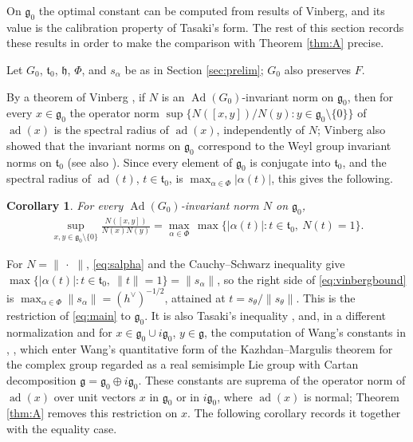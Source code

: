 \documentclass [leqno, 10pt]{amsart}
\newtheorem{corollary}[theorem]{Corollary}%
\theoremstyle{definition}
\numberwithin{equation}{section}
\newcommand{\h}{\mathfrak{h}}
\newcommand{\dum}{\,\cdot\,\,}
\newcommand{\al}{\alpha}
\newcommand{\g}{\mathfrak{g}}
\newcommand{\ad}{\operatorname{ad}}
\newcommand{\Ad}{\operatorname{Ad}}
\newcommand{\gz}{\g_{0}}
\newcommand{\hv}{h^\vee}
\newcommand{\norm}[1]{\lVert #1\rVert}
\begin{document}
On $\gz$ the optimal constant can be computed from results of Vinberg, and its value is the calibration property of Tasaki's form. The rest of this section records these results in order to make the comparison with Theorem \ref{thm:A} precise.

Let $G_{0}$, $\mathfrak{t}_{0}$, $\h$, $\Phi$, and $s_{\al}$ be as in Section \ref{sec:prelim}; $G_{0}$ also preserves $F$.

By a theorem of Vinberg \cite[Theorem~2]{Vinberg-invariantnorms}, if $N$ is an $\Ad(G_{0})$-invariant norm on $\gz$, then for every $x \in \gz$ the operator norm $\sup\{N([x, y])/N(y): y \in \gz \setminus \{0\}\}$ of $\ad(x)$ is the spectral radius of $\ad(x)$, independently of $N$; Vinberg also showed that the invariant norms on $\gz$ correspond to the Weyl group invariant norms on $\mathfrak{t}_{0}$ \cite[Theorem~1]{Vinberg-invariantnorms} (see also \cite{Berestovksii-Nikonorov}). Since every element of $\gz$ is conjugate into $\mathfrak{t}_{0}$, and the spectral radius of $\ad(t)$, $t \in \mathfrak{t}_{0}$, is $\max_{\al \in \Phi}|\al(t)|$, this gives the following.
\begin{corollary}\label{cor:vinberg}
For every $\Ad(G_{0})$-invariant norm $N$ on $\gz$,
\begin{align}\label{eq:vinbergbound}
\sup_{x, y \in \gz\setminus\{0\}}\frac{N([x, y])}{N(x)N(y)} = \max_{\al \in \Phi}\,\max\big\{|\al(t)|: t \in \mathfrak{t}_{0},\ N(t) = 1\big\}.
\end{align}
\end{corollary}
For $N = \norm{\dum}$, \eqref{eq:salpha} and the Cauchy--Schwarz inequality give $\max\{|\al(t)| : t \in \mathfrak{t}_{0},\ \norm{t} = 1\} = \norm{s_{\al}}$, so the right side of \eqref{eq:vinbergbound} is $\max_{\al \in \Phi}\norm{s_{\al}} = (\hv)^{-1/2}$, attained at $t = s_{\theta}/\norm{s_{\theta}}$. This is the restriction of \eqref{eq:main} to $\gz$. It is also Tasaki's inequality \cite[(8) in the proof of Theorem~5]{Tasaki-calibration}, and, in a different normalization and for $x \in \gz \cup i\gz$, $y \in \g$, the computation of Wang's constants in \cite{Wang-nilpotent}, \cite[Proposition 4.1]{Adeboye-Wang-Wei}, which enter Wang's quantitative form of the Kazhdan--Margulis theorem for the complex group regarded as a real semisimple Lie group with Cartan decomposition $\g = \gz \oplus i\gz$. These constants are suprema of the operator norm of $\ad(x)$ over unit vectors $x$ in $\gz$ or in $i\gz$, where $\ad(x)$ is normal; Theorem \ref{thm:A} removes this restriction on $x$. The following corollary records it together with the equality case.
\end{document}
